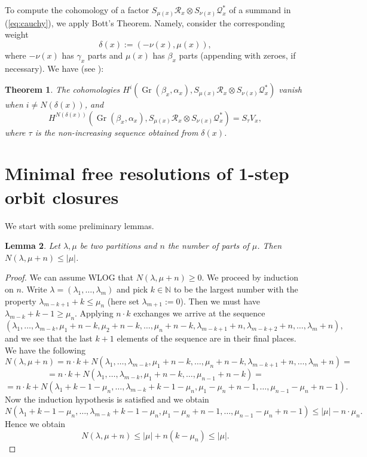 \documentclass[twoside]{article}
\newcommand{\nat}{\mathbb{N}}
\newcommand{\op}{\operatorname}
\newtheorem{theorem}{Theorem}[section]
\newtheorem{lemma}[theorem]{Lemma}
\theoremstyle{definition}
\begin{document}
To compute the cohomology of a factor $S_{\mu(x)} \mathcal{R}_x \otimes S_{\nu(x)} \mathcal{Q}_x^*$ of a summand in (\ref{eq:cauchy}), we apply Bott's Theorem. Namely, consider the corresponding weight
$$\delta(x):=(-\nu(x),\mu(x)),$$
where $-\nu(x)$ has $\gamma_x$ parts and $\mu(x)$ has $\beta_x$ parts (appending with zeroes, if necessary). We have (see \cite[Corollary 4.1.7, Corollary 4.1.9]{jerzy}):

\begin{theorem}\label{thm:bott}
The cohomologies $H^i(\op{Gr}(\beta_x,\alpha_x), S_{\mu(x)} \mathcal{R}_x \otimes S_{\nu(x)} \mathcal{Q}_x^*)$ vanish when $i\neq N(\delta(x))$, and 
$$H^{N(\delta(x))}(\op{Gr}(\beta_x,\alpha_x), S_{\mu(x)} \mathcal{R}_x \otimes S_{\nu(x)} \mathcal{Q}_x^*)=S_{\tau} V_x,$$
where $\tau$ is the non-increasing sequence obtained from $\delta(x)$.
\end{theorem}


\section{Minimal free resolutions of 1-step orbit closures}\label{sec:main}

\vspace{0.05in}

We start with some preliminary lemmas.

\begin{lemma}
\label{lem:first}
Let $\lambda,\mu$ be two partitions and $n$ the number of parts of $\mu$. Then $N(\lambda, \mu+n)\leq |\mu|$. 
\end{lemma}

\begin{proof}
We can assume WLOG that $N(\lambda, \mu+n)\geq 0$. We proceed by induction on $n$. Write $\lambda=(\lambda_1,\dots,\lambda_m)$ and pick $k\in \nat$ to be the largest number with the property $\lambda_{m-k+1}+k\leq \mu_n$ (here set $\lambda_{m+1}:=0$). Then we must have $\lambda_{m-k}+k-1\geq \mu_n$. Applying $n\cdot k$ exchanges we arrive at the sequence
$$(\lambda_1,\dots, \lambda_{m-k},\mu_1+n-k,\mu_2+n-k,\dots, \mu_n+n-k, \lambda_{m-k+1}+n, \lambda_{m-k+2}+n,\dots, \lambda_{m}+n),$$
and we see that the last $k+1$ elements of the sequence are in their final places. We have the following
$$N(\lambda, \mu+n)=n\cdot k + N(\lambda_1,\dots, \lambda_{m-k},\mu_1+n-k,\dots, \mu_n+n-k, \lambda_{m-k+1}+n,\dots, \lambda_{m}+n)=$$
$$=n\cdot k + N(\lambda_1,\dots, \lambda_{m-k},\mu_1+n-k,\dots, \mu_{n-1}+n-k)= $$
$$=n\cdot k + N(\lambda_1+k-1-\mu_n,\dots, \lambda_{m-k}+k-1-\mu_n,\mu_1-\mu_n+n-1,\dots, \mu_{n-1}-\mu_n+n-1).$$
Now the induction hypothesis is satisfied and we obtain 
$$N(\lambda_1+k-1-\mu_n,\dots, \lambda_{m-k}+k-1-\mu_n,\mu_1-\mu_n+n-1,\dots, \mu_{n-1}-\mu_n+n-1)\leq |\mu|-n\cdot \mu_n.$$
Hence we obtain 
$$N(\lambda, \mu+n)\leq |\mu|+n(k-\mu_n) \leq |\mu|.$$
\end{proof}
\end{document}
